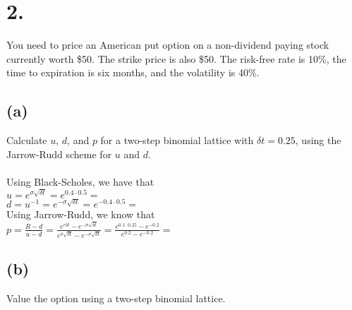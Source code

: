 \documentclass{article}
\begin{document}
\section*{2.}
{\Large

You need to price an American put option on a non-dividend paying stock currently worth \$50.  The strike price is also \$50.  The risk-free rate is 10\%, the time to expiration is six months, and the volatility is 40\%.



\subsection*{(a)}

Calculate $u$, $d$, and $p$ for a two-step binomial lattice with $\delta t = 0.25$, using the Jarrow-Rudd scheme for $u$ and $d$. \\ \\

Using Black-Scholes, we have that \\
$u = e^{\sigma \sqrt{\delta t}} = e^{0.4 \cdot 0.5} = $  \\
$d = u^{-1} = e^{-\sigma \sqrt{\delta t}} = e^{-0.4 \cdot 0.5} = $  \\
Using Jarrow-Rudd, we know that \\
$p = \frac{R - d}{u - d} = \frac{e^{r \delta t} - e^{-\sigma \sqrt{\delta t}}}{e^{\sigma \sqrt{\delta t}} - e^{-\sigma \sqrt{\delta t}}} = \frac{e^{0.1 \cdot 0.25} - e^{-0.2}}{e^{0.2} - e^{-0.2}} = $ 


\subsection*{(b)}

Value the option using a two-step binomial lattice. \\ \\

}
\end{document}
